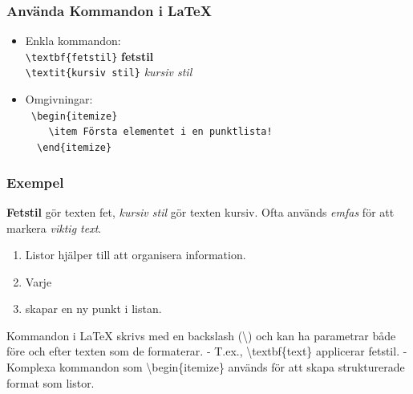 \begin{frame}[fragile]
\frametitle{Använda Kommandon i LaTeX}

\begin{itemize}
  \begin{itemize}
    \item Enkla kommandon: \\
    \texttt{\textbackslash textbf\{fetstil\}} \hfill \textbf{fetstil}\\
    \texttt{\textbackslash textit\{kursiv stil\}}  \hfill \textit{kursiv stil}
    \item Omgivningar:\\ 
    \texttt{
      \textbackslash begin\{itemize\} \\
      ~~~~\textbackslash item Första elementet i en punktlista! \\
      ~~\textbackslash end\{itemize\}
    }
  \end{itemize}
\end{itemize}
\end{frame}

\begin{frame}[fragile,t]
  \frametitle{Exempel}\SlideFontSmall
  \vspace{2em}

  \begin{exlatex}
\textbf{Fetstil} gör texten fet, \textit{kursiv stil} gör texten kursiv. 
Ofta används \emph{emfas} för att markera \emph{viktig text}.  
  \end{exlatex}

  \blankline
  \begin{exlatex}
\begin{enumerate}
  \item Listor hjälper till att organisera information.
  \item Varje \item skapar en ny punkt i listan.
\end{enumerate}
  \end{exlatex}
  
    Kommandon i LaTeX skrivs med en backslash (\textbackslash) och kan ha parametrar både före och efter texten som de formaterar.
    - T.ex., \textbackslash textbf\{text\} applicerar fetstil.
    - Komplexa kommandon som \textbackslash begin\{itemize\} används för att skapa strukturerade format som listor.

\end{frame}

